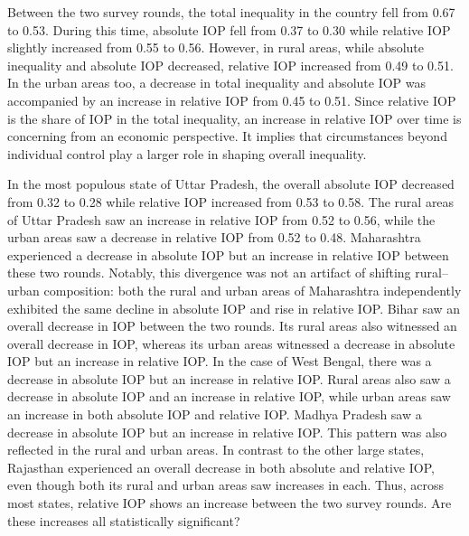 \documentclass[12pt]{article}
\theoremstyle{plain}
\theoremstyle{definition}
\begin{document}
Between the two survey rounds, the total inequality in the country fell from 0.67 to 0.53. During this time, absolute IOP fell from 0.37 to 0.30 while relative IOP slightly increased from 0.55 to 0.56. However, in rural areas, while absolute inequality and absolute IOP decreased, relative IOP increased from 0.49 to 0.51. In the urban areas too, a decrease in total inequality and absolute IOP was accompanied by an increase in relative IOP from 0.45 to 0.51. Since relative IOP is the share of IOP in the total inequality, an increase in relative IOP over time is concerning from an economic perspective. It implies that circumstances beyond individual control play a larger role in shaping overall inequality.

In the most populous state of Uttar Pradesh, the overall absolute IOP decreased from 0.32 to 0.28 while relative IOP increased from 0.53 to 0.58. The rural areas of Uttar Pradesh saw an increase in relative IOP from 0.52 to 0.56, while the urban areas saw a decrease in relative IOP from 0.52 to 0.48. Maharashtra experienced a decrease in absolute IOP but an increase in relative IOP between these two rounds. Notably, this divergence was not an artifact of shifting rural--urban composition: both the rural and urban areas of Maharashtra independently exhibited the same decline in absolute IOP and rise in relative IOP. Bihar saw an overall decrease in IOP between the two rounds. Its rural areas also witnessed an overall decrease in IOP, whereas its urban areas witnessed a decrease in absolute IOP but an increase in relative IOP. In the case of West Bengal, there was a decrease in absolute IOP but an increase in relative IOP. Rural areas also saw a decrease in absolute IOP and an increase in relative IOP, while urban areas saw an increase in both absolute IOP and relative IOP. Madhya Pradesh saw a decrease in absolute IOP but an increase in relative IOP. This pattern was also reflected in the rural and urban areas. In contrast to the other large states, Rajasthan experienced an overall decrease in both absolute and relative IOP, even though both its rural and urban areas saw increases in each. Thus, across most states, relative IOP shows an increase between the two survey rounds. Are these increases all statistically significant? 


\end{document}
